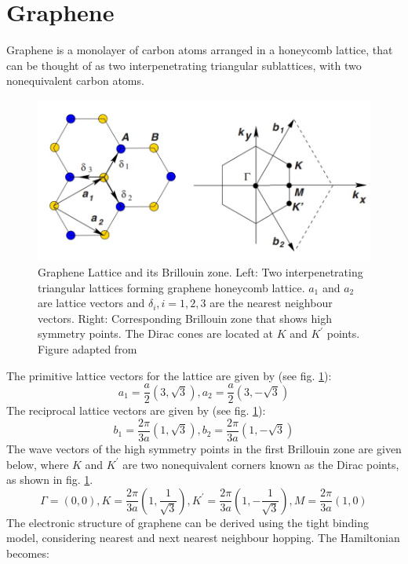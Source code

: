 \section{Graphene}
Graphene is a monolayer of carbon atoms arranged in a honeycomb lattice, that can be thought of as two interpenetrating triangular sublattices, with two nonequivalent carbon atoms.
\begin{figure}[H]
         \centering
         \includegraphics[width=\textwidth]{figures/lattice.jpg}
         \caption{Graphene Lattice and its Brillouin zone. Left: Two interpenetrating triangular lattices forming graphene honeycomb lattice. $a_1$ and $a_2$ are lattice vectors and $\delta_i, i=1,2,3$ are the nearest neighbour vectors. Right: Corresponding Brillouin zone that shows high symmetry points. The Dirac cones are located at $K$ and $K^\prime$ points. Figure adapted from \cite{Geim}}
         \label{fig:lattice}
\end{figure}
The primitive lattice vectors for the lattice are given by (see fig. \ref{fig:lattice}):
\begin{equation}
    a_1 = \frac{a}{2}(3,\sqrt{3}), a_2 = \frac{a}{2}(3,-\sqrt{3})
\end{equation}
The reciprocal lattice vectors are given by (see fig. \ref{fig:lattice}):
\begin{equation}
    b_1 = \frac{2\pi}{3a}(1,\sqrt{3}), b_2 = \frac{2\pi}{3a}(1,-\sqrt{3})
\end{equation}
The wave vectors of the high symmetry points in the first Brillouin zone are given below, where $K$ and $K^{\prime}$ are two nonequivalent corners known as the Dirac points, as shown in fig. \ref{fig:lattice}.
\begin{equation}
    \Gamma = (0,0),K=\frac{2\pi}{3a}(1,\frac{1}{\sqrt{3}}),K^{\prime}=\frac{2\pi}{3a}(1,-\frac{1}{\sqrt{3}}),M=\frac{2\pi}{3a}(1,0)
\end{equation}
The electronic structure of graphene can be derived using the tight binding model, considering nearest and next nearest neighbour hopping. The Hamiltonian becomes:
